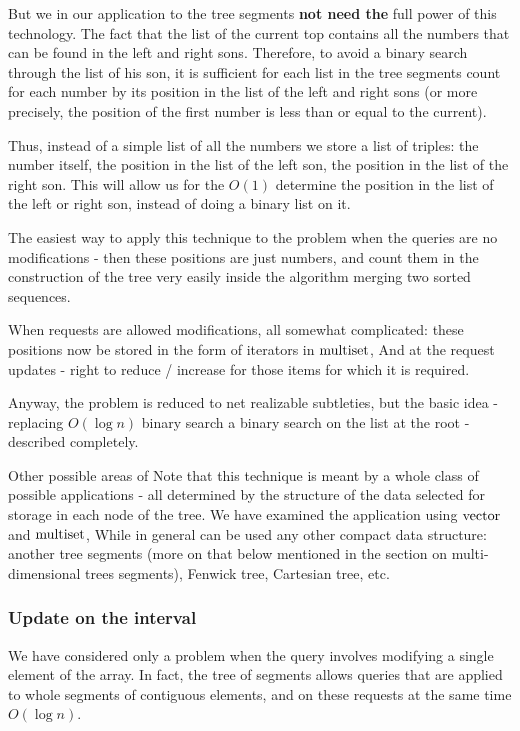 But we in our application to the tree segments \textbf{not need the} full power of this technology. The fact that the list of the current top contains all the numbers that can be found in the left and right sons. Therefore, to avoid a binary search through the list of his son, it is sufficient for each list in the tree segments count for each number by its position in the list of the left and right sons (or more precisely, the position of the first number is less than or equal to the current).

Thus, instead of a simple list of all the numbers we store a list of triples: the number itself, the position in the list of the left son, the position in the list of the right son. This will allow us for the $O (1)$ determine the position in the list of the left or right son, instead of doing a binary list on it.

The easiest way to apply this technique to the problem when the queries are no modifications - then these positions are just numbers, and count them in the construction of the tree very easily inside the algorithm merging two sorted sequences.

When requests are allowed modifications, all somewhat complicated: these positions now be stored in the form of iterators in $\rm multiset$, And at the request updates - right to reduce / increase for those items for which it is required.

Anyway, the problem is reduced to net realizable subtleties, but the basic idea - replacing $O (\log n)$ binary search a binary search on the list at the root - described completely.

Other possible areas of
Note that this technique is meant by a whole class of possible applications - all determined by the structure of the data selected for storage in each node of the tree. We have examined the application using $\rm vector$ and $\rm multiset$, While in general can be used any other compact data structure: another tree segments (more on that below mentioned in the section on multi-dimensional trees segments), Fenwick tree, Cartesian tree, etc.

\subsubsection{ Update on the interval }

We have considered only a problem when the query involves modifying a single element of the array. In fact, the tree of segments allows queries that are applied to whole segments of contiguous elements, and on these requests at the same time $O (\log n)$.

